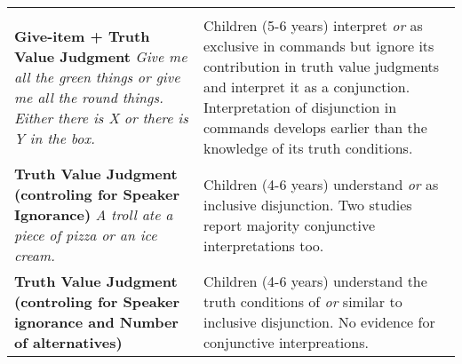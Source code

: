 \documentclass[,man,floatsintext]{apa6}
\begin{document}
\begin{longtable}[]{@{}ll@{}}
\begin{minipage}[t]{0.52\columnwidth}
\end{minipage}\tabularnewline
\begin{minipage}[t]{0.42\columnwidth}\raggedright
\textbf{Give-item + Truth Value Judgment} \newline \textit{Give me all the green things or give me all the round things.} \newline \textit{Either there is X or there is Y in the box.}\strut
\end{minipage} & \begin{minipage}[t]{0.52\columnwidth}\raggedright
Children (5-6 years) interpret \emph{or} as exclusive in commands but ignore its contribution in truth value judgments and interpret it as a conjunction. Interpretation of disjunction in commands develops earlier than the knowledge of its truth conditions.\strut
\end{minipage}\tabularnewline
\begin{minipage}[t]{0.42\columnwidth}\raggedright
\textbf{Truth Value Judgment (controling for Speaker Ignorance)} \newline \textit{A troll ate a piece of pizza or an ice cream.}\strut
\end{minipage} & \begin{minipage}[t]{0.52\columnwidth}\raggedright
Children (4-6 years) understand \emph{or} as inclusive disjunction. Two studies report majority conjunctive interpretations too.\strut
\end{minipage}\tabularnewline
\begin{minipage}[t]{0.42\columnwidth}\raggedright
\textbf{Truth Value Judgment (controling for Speaker ignorance and Number of alternatives)}\strut
\end{minipage} & \begin{minipage}[t]{0.52\columnwidth}\raggedright
Children (4-6 years) understand the truth conditions of \emph{or} similar to inclusive disjunction. No evidence for conjunctive interpreations.\strut
\end{minipage}\tabularnewline
\bottomrule
\end{longtable}
\end{document}
